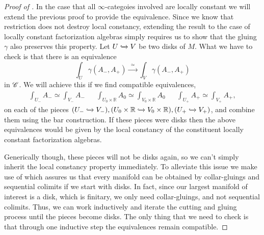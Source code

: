 \documentclass[../text]{subfiles}
\begin{document}
\begin{proof}[Proof of ]
    In the case that all $\infty$-categoies involved are locally constant we will extend the previous proof to provide the equivalence. Since we know that restriction does not destroy local constancy, extending the result to the case of locally constant factorization algebras simply requires us to show that the gluing $\gamma$ also preserves this property. Let $U \xhookrightarrow{} V$ be two disks of $M$. What we have to check is that there is an equivalence
    \begin{equation}
        \int_U \gamma(A_-, A_+) \xrightarrow{\ \ \simeq \ \ } \int_V \gamma(A_-, A_+)
    \end{equation}
    in $\mathscr{C}$. We will achieve this if we find compatible equivalences,
    \begin{align}
        &\int_{U_-} A_- \simeq \int_{V_-} A_-& &\int_{U_0 \times \mathbb{R}} A_0 \simeq \int_{V_0 \times \mathbb{R}} A_0& &\int_{U_+} A_+ \simeq \int_{V_+} A_+,&
    \end{align}
    on each of the pieces $(U_- \xhookrightarrow{} V_-), (U_0 \times \mathbb{R} \xhookrightarrow{} V_0 \times \mathbb{R}), (U_+ \xhookrightarrow{} V_+)$, and combine them using the bar construction. If these pieces were disks then the above equivalences would be given by the local constancy of the constituent locally constant factorization algebras.
    
    Generically though, these pieces will not be disks again, so we can't simply inherit the local constancy property immediately. To alleviate this issue we make use of  which assures us that every manifold can be obtained by collar-gluings and sequential colimits if we start with disks. In fact, since our largest manifold of interest is a disk, which is finitary, we only need collar-gluings, and not sequential colimits. Thus, we can work inductively and iterate the cutting and gluing process until the pieces become disks. The only thing that we need to check is that through one inductive step the equivalences remain compatible.
    

\end{proof}
\end{document}

